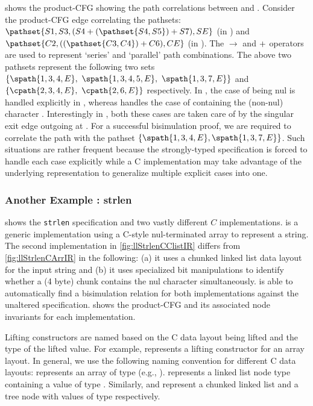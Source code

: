  shows the product-CFG showing the path correlations between \sprog{} and \cprog{}.
Consider the product-CFG edge  correlating the pathsets:
{\small $\pathset{S1,S3,(S4 \pathpar (\pathset{S4,S5}) \pathpar S7), SE}$} (in \sprog{}) and
{\small $\pathset{C2,((\pathset{C3,C4}) \pathpar C6),CE}$} (in \cprog{}).
The $\rightarrow$ and $+$ operators are used to represent `series' and `parallel' path combinations.
The above two pathsets represent the following two sets
{\small $\{ \spath{1,3,4,E},\ \spath{1,3,4,5,E},\ \spath{1,3,7,E} \}$} and
{\small $\{ \cpath{2,3,4,E},\ \cpath{2,6,E} \}$} respectively.
In \sprog{}, the case of  being nul is handled explicitly in , whereas
 handles the case of  containing the (non-nul) character .
Interestingly in \cprog{}, both these cases are taken care of by the singular exit edge outgoing at .
For a successful bisimulation proof, we are required to correlate the \cprog{} path
 with the \sprog{} pathset $\{ \spath{1,3,4,E}, \spath{1,3,7,E} \}$.
Such situations are rather frequent because the strongly-typed specification is forced to handle
each case explicitly while a C implementation may take advantage of the
underlying representation to generalize multiple explicit cases into one.




\subsubsection{Another Example : strlen}
 shows the {\tt strlen} specification and two vastly
different $C$ implementations.  is a generic implementation
using a C-style nul-terminated array to represent a string.
The second implementation in \cref{fig:llStrlenCClistIR} differs from \cref{fig:llStrlenCArrIR}
in the following: (a) it uses a chunked linked list data layout for the input string
and (b) it uses specialized bit manipulations to identify whether a (4 byte) chunk contains the nul character simultaneously.
\toolName{} is able to automatically find a bisimulation relation
for both implementations against the unaltered specification.
 shows the product-CFG and its associated node invariants for each implementation.

Lifting constructors are named based on the C data layout being lifted
and the type of the lifted value.
For example,  represents a  lifting constructor
for an array layout.
In general, we use the following naming convention for different C data layouts:
 represents an array of type  (e.g., ).
 represents a linked list node type containing a value of type .
Similarly,  and  represent a chunked linked list and a tree node
with values of type  respectively.

